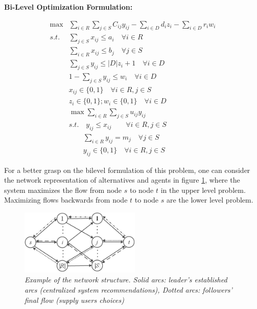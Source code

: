 \documentclass[11pt, letterpaper]{article}
\begin{document}
\begin{flushleft}
\textbf{Bi-Level Optimization Formulation: }
\end{flushleft}
\begin{align}
 \max			& \displaystyle\sum_{i \in	R} \displaystyle\sum_{j \in S}  C_{ij} y_{ij} - \displaystyle\sum_{i \in D} d_i	z_{i}	- \displaystyle\sum_{i \in D} r_i w_{i}		\label{systemobjective} \\
    s.t.       & \displaystyle\sum_{j \in S} x_{ij} \leq a_i  \quad\forall i \in R \label{upperdemand}\\
&\displaystyle\sum_{i \in R} x_{ij} \leq b_j   \quad\forall j \in S \label{uppersupply}\\
& \displaystyle\sum_{j \in S} y_{ij} \leq |D| z_{i} + 1   \quad\forall i \in D \label{duplicateconstraint} \\ 
& 1-\displaystyle\sum_{j \in S} y_{ij} \leq w_{i}  \quad\forall i \in D \label{fullrejectionconstraint} \\ 
&  x_{ij} \in \{ 0,1 \}  \quad \forall i \in R, j\in S  \label{variables_leader2} \\
&  z_{i} \in \{ 0,1 \}; w_{i} \in \{ 0,1 \}  \quad \forall i \in D \label{variables_leader1} \\
& \max \displaystyle\sum_{i \in	R} \displaystyle\sum_{j \in S} u_{ij} y_{ij} \label{followerobjective} \\
& 	s.t. \quad y_{ij} \leq x_{ij}  \quad\quad\forall i \in R, j \in S \label{hookingconstraint} \\
& \quad \quad \displaystyle\sum_{i \in	R} y_{ij} = m_j  \quad\forall j \in S \label{upperlevelofselection}\\ 
&  \quad \quad  y_{ij}  \in \{ 0,1 \} \quad  \forall i \in R, j\in S \label{variables_follower}		
\end{align}

For a better grasp on the bilevel formulation of this problem, one can consider the network representation of alternatives and agents in figure \ref{fig:network}, where the system maximizes the flow from node $s$ to node $t$ in the upper level problem. Maximizing flows backwards from node $t$ to node $s$ are the lower level problem.
\begin{figure}
	\centering
	\includegraphics[width=0.51\textwidth]{network_rep.png}
	\caption{\emph{Example of the network structure. Solid arcs: leader's established arcs (centralized system recommendations), Dotted arcs: followers' final flow (supply users choices)}}   \label{fig:network}
\end{figure}  
\noindent
\end{document}
